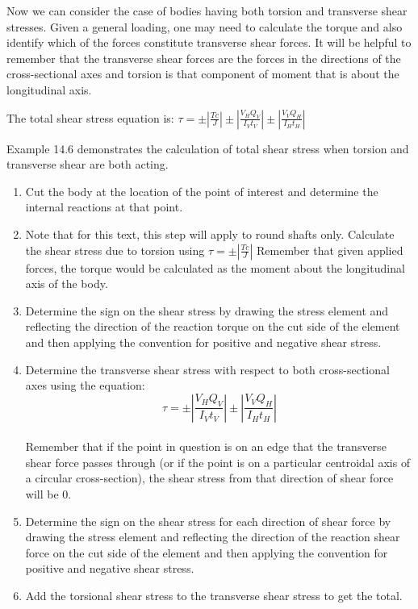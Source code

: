 \documentclass[
  letterpaper,
  DIV=11,
  numbers=noendperiod]{scrreprt}
\providecommand{\tightlist}{%
  \setlength{\itemsep}{0pt}\setlength{\parskip}{0pt}}\usepackage{longtable,booktabs,array}
\begin{document}
Now we can consider the case of bodies having both torsion and
transverse shear stresses. Given a general loading, one may need to
calculate the torque and also identify which of the forces constitute
transverse shear forces. It will be helpful to remember that the
transverse shear forces are the forces in the directions of the
cross-sectional axes and torsion is that component of moment that is
about the longitudinal axis.

The total shear stress equation is:
\(\tau= \pm\left|\frac{T c}{J}\right| \pm\left|\frac{V_H Q_V}{I_V t_V}\right| \pm\left|\frac{V_V Q_H}{I_H t_H}\right|\)

Example 14.6 demonstrates the calculation of total shear stress when
torsion and transverse shear are both acting.

\begin{tcolorbox}[enhanced jigsaw, breakable, opacityback=0, toptitle=1mm, left=2mm, colback=white, opacitybacktitle=0.6, colframe=quarto-callout-note-color-frame, titlerule=0mm, arc=.35mm, leftrule=.75mm, bottomtitle=1mm, colbacktitle=quarto-callout-note-color!10!white, rightrule=.15mm, title={Step-by-step: Combined shear stress}, bottomrule=.15mm, toprule=.15mm, coltitle=black]

\begin{enumerate}
\def\labelenumi{\arabic{enumi}.}
\tightlist
\item
  Cut the body at the location of the point of interest and determine
  the internal reactions at that point.
\item
  Note that for this text, this step will apply to round shafts only.
  Calculate the shear stress due to torsion using
  \(\tau= \pm\left|\frac{T c}{J}\right|\) Remember that given applied
  forces, the torque would be calculated as the moment about the
  longitudinal axis of the body.
\item
  Determine the sign on the shear stress by drawing the stress element
  and reflecting the direction of the reaction torque on the cut side of
  the element and then applying the convention for positive and negative
  shear stress.
\item
  Determine the transverse shear stress with respect to both
  cross-sectional axes using the equation:\\
  \[
  \tau= \pm\left|\frac{V_H Q_V}{I_V t_V}\right| \pm\left|\frac{V_V Q_H}{I_H t_H}\right|
  \]\\
  Remember that if the point in question is on an edge that the
  transverse shear force passes through (or if the point is on a
  particular centroidal axis of a circular cross-section), the shear
  stress from that direction of shear force will be 0.
\item
  Determine the sign on the shear stress for each direction of shear
  force by drawing the stress element and reflecting the direction of
  the reaction shear force on the cut side of the element and then
  applying the convention for positive and negative shear stress.
\item
  Add the torsional shear stress to the transverse shear stress to get
  the total.
\end{enumerate}

\end{tcolorbox}
\end{document}
